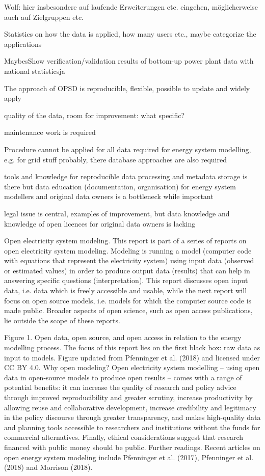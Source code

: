 \item Wolf: hier insbesondere auf laufende Erweiterungen etc. eingehen, möglicherweise auch auf Zielgruppen etc. 
    \item Statistics on how the data is applied, how many users etc., maybe categorize the applications
    \item MaybesShow verification/validation results of bottom-up power plant data with national statisticsja
    \item The approach of OPSD is reproducible, flexible, possible to update and widely apply
    \item quality of the data, room for improvement: what specific?
    \item maintenance work is required
    \item Procedure cannot be applied for all data required for energy system modelling, e.g. for grid stuff probably, there database approaches are also required
    \item tools and knowledge for reproducible data processing and metadata storage is there but data education (documentation, organisation) for energy system modellers and original data owners is a bottleneck while important
    \item legal issue is central, examples of improvement, but data knowledge and knowledge of open licences for original data owners is lacking
    
    
Open electricity system modeling. This report is part of a series of reports on open electricity system modeling. Modeling is running a model (computer code with equations that represent the electricity system) using input data (observed or estimated values) in order to produce output data (results) that can help in answering specific questions (interpretation). This report discusses open input data, i.e. data which is freely accessible and usable, while the next report will focus on open source models, i.e. models for which the computer source code is made public. Broader aspects of open science, such as open access publications, lie outside the scope of these reports.

 

Figure 1. Open data, open source, and open access in relation to the energy modelling process. The focus of this report lies on the first black box: raw data as input to models. Figure updated from Pfenninger et al. (2018) and licensed under CC BY 4.0.
Why open modeling? Open electricity system modelling – using open data in open-source models to produce open results – comes with a range of potential benefits: it can increase the quality of research and policy advice through improved reproducibility and greater scrutiny, increase productivity by allowing reuse and collaborative development, increase credibility and legitimacy in the policy discourse through greater transparency, and makes high-quality data and planning tools accessible to researchers and institutions without the funds for commercial alternatives. Finally, ethical considerations suggest that research financed with public money should be public.
Further readings. Recent articles on open energy system modeling include Pfenninger et al. (2017), Pfenninger et al. (2018) and Morrison (2018).

